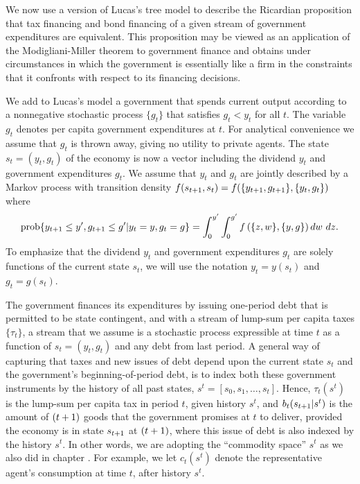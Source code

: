 We now use a version of Lucas's tree model to describe the Ricardian
proposition that tax financing and bond financing of a given stream of
government expenditures are equivalent.  This proposition may
be viewed as an application of the Modigliani-Miller theorem to
government finance and obtains under circumstances in which the government is
essentially like a firm in the constraints that it confronts with respect to
its financing decisions.

We add to Lucas's model a government that spends current output according
to a nonnegative stochastic process $\{g_t\}$ that satisfies $g_t<y_t$ for all
$t$.  The variable $g_t$ denotes per capita government expenditures at $t$.
For analytical convenience we assume that $g_t$ is thrown away, giving  no
utility to private agents.  The state $s_t = (y_t,g_t)$ of the economy is now
a vector including the dividend $y_t$ and government expenditures $g_t$.
We assume that $y_t$ and $g_t$ are jointly described by a Markov process
with transition density $f(s_{{t+1}}, s_t) =
f(\{y_{{t+1}}, g_{{t+1}}\},\{y_t,g_t\})$ where
$${\rm prob} \{y_{{t+1}}\le y', g_{{t+1}}\le g'|y_t=y,g_t=g\}
=\int_0^{y'} \int_0^{g'} f\left(\{z,w\},\{y,g\}\right) dw\ dz.$$
To emphasize that the dividend $y_t$ and government expenditures $g_t$
are solely functions of the current state $s_t$, we will use the notation
$y_t=y(s_t)$ and $g_t = g(s_t)$.

The government finances its expenditures by
issuing one-period debt that is permitted to be state contingent, and with a
stream of lump-sum per capita taxes $\{\tau_t\}$, a stream that we assume is a
stochastic process expressible at time $t$ as a function of $s_t = (y_t,g_t)$
and any debt from last period. A general way of capturing that taxes and
new issues of debt depend upon the current state $s_t$ and the government's
beginning-of-period debt, is to index both these government instruments by the
history of all past states, $s^t=[s_0, s_1, \ldots, s_t]$. Hence, $\tau_t(s^t)$
is the lump-sum per capita tax in period $t$, given history $s^t$, and
$b_t(s_{{t+1}}|s^t)$ is the amount of $({t+1})$ goods that the government
promises at $t$ to deliver, provided the economy is in state $s_{{t+1}}$ at
$({t+1})$, where this issue of debt is also indexed by the history $s^t$.
In other words, we are adopting the ``commodity space'' $s^t$ as we also
did in chapter . For example, we let $c_t(s^t)$ denote
the representative agent's consumption at time $t$, after history $s^t$.


